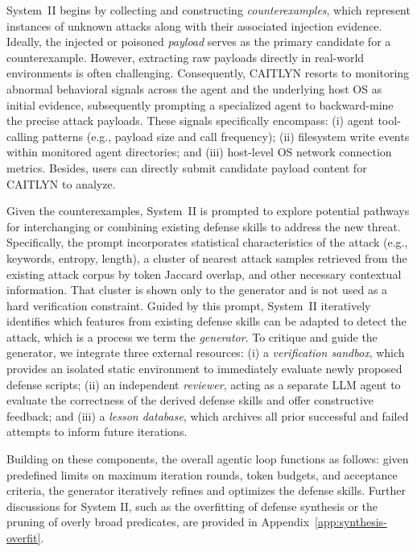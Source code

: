 System~II begins by collecting and constructing
\emph{counterexamples}, which represent instances of unknown attacks
along with their associated injection evidence. Ideally, the injected
or poisoned \emph{payload} serves as the primary candidate for a
counterexample. However, extracting raw payloads directly in
real-world environments is often challenging. Consequently, CAITLYN
resorts to monitoring abnormal behavioral signals across the agent and
the underlying host OS as initial evidence, subsequently prompting a
specialized agent to backward-mine the precise attack payloads. These
signals specifically encompass: (i) agent tool-calling patterns (e.g.,
payload size and call frequency); (ii) filesystem write events within
monitored agent directories; and (iii) host-level OS network
connection metrics. Besides, users can directly submit candidate
payload content for CAITLYN to analyze.

Given the counterexamples, System~II is prompted to explore potential
pathways for interchanging or combining existing defense skills to
address the new threat. Specifically, the prompt incorporates
statistical characteristics of the attack (e.g., keywords, entropy,
length), a cluster of nearest attack samples retrieved from the
existing attack corpus by token Jaccard overlap, and other necessary
contextual information. That cluster is shown only to the generator
and is not used as a hard verification constraint. Guided by this prompt,
System~II iteratively identifies which features from existing defense
skills can be adapted to detect the attack, which is a process we term
the \emph{generator}. To critique and guide the generator, we
integrate three external resources: (i) a \emph{verification sandbox},
which provides an isolated static environment to immediately evaluate
newly proposed defense scripts; (ii) an independent \emph{reviewer},
acting as a separate LLM agent to evaluate the correctness of the
derived defense skills and offer constructive feedback; and (iii) a
\emph{lesson database}, which archives all prior successful and failed
attempts to inform future iterations.

Building on these components, the overall agentic loop functions as
follows: given predefined limits on maximum iteration rounds, token
budgets, and acceptance criteria, the generator iteratively refines
and optimizes the defense skills.
Further discussions for System II, such as the
overfitting of defense synthesis or the pruning of overly broad
predicates, are provided in Appendix~\ref{app:synthesis-overfit}.

